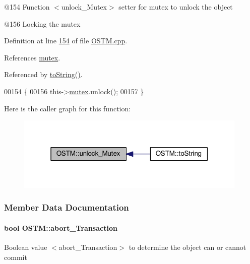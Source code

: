 @154 Function $<$unlock\+\_\+\+Mutex$>$ setter for mutex to unlock the object 

@156 Locking the mutex 

Definition at line \hyperlink{_o_s_t_m_8cpp_source_l00154}{154} of file \hyperlink{_o_s_t_m_8cpp_source}{O\+S\+T\+M.\+cpp}.



References \hyperlink{_o_s_t_m_8h_source_l00139}{mutex}.



Referenced by \hyperlink{_o_s_t_m_8h_source_l00051}{to\+String()}.


\begin{DoxyCode}
00154                         \{
00156     this->\hyperlink{class_o_s_t_m_aaab0921fd1564b793f882a5002ec7106_aaab0921fd1564b793f882a5002ec7106}{mutex}.unlock();
00157 \}
\end{DoxyCode}


Here is the caller graph for this function\+:\nopagebreak
\begin{figure}[H]
\begin{center}
\leavevmode
\includegraphics[width=313pt]{class_o_s_t_m_a6cd703bc26c719fd95b4f5362d050762_a6cd703bc26c719fd95b4f5362d050762_icgraph}
\end{center}
\end{figure}




\subsubsection{Member Data Documentation}
\paragraph[{\texorpdfstring{abort\+\_\+\+Transaction}{abort_Transaction}}]{\setlength{\rightskip}{0pt plus 5cm}bool O\+S\+T\+M\+::abort\+\_\+\+Transaction\hspace{0.3cm}{\ttfamily [private]}}\hypertarget{class_o_s_t_m_a5121d9c4b08320b26beca82ba2f85c4a_a5121d9c4b08320b26beca82ba2f85c4a}{}\label{class_o_s_t_m_a5121d9c4b08320b26beca82ba2f85c4a_a5121d9c4b08320b26beca82ba2f85c4a}
Boolean value $<$abort\+\_\+\+Transaction$>$ to determine the object can or cannot commit 

